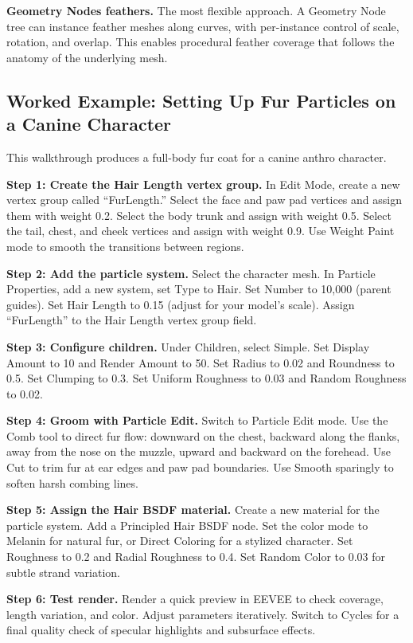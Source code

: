 \textbf{Geometry Nodes feathers.} The most flexible approach. A Geometry Node tree can instance feather meshes along curves, with per-instance control of scale, rotation, and overlap. This enables procedural feather coverage that follows the anatomy of the underlying mesh.



\subsection{Worked Example: Setting Up Fur Particles on a Canine Character}
\label{subsec:worked-fur-particles}

\begin{furrybox}[title={\sffamily\bfseries\small\textcolor{white}{Worked Example --- Complete Fur Particle Setup}}]
This walkthrough produces a full-body fur coat for a canine anthro character.

\textbf{Step 1: Create the Hair Length vertex group.}
In Edit Mode, create a new vertex group called ``FurLength.'' Select the face and paw pad vertices and assign them with weight 0.2. Select the body trunk and assign with weight 0.5. Select the tail, chest, and cheek vertices and assign with weight 0.9. Use Weight Paint mode to smooth the transitions between regions.

\textbf{Step 2: Add the particle system.}
Select the character mesh. In Particle Properties, add a new system, set Type to Hair. Set Number to 10,000 (parent guides). Set Hair Length to 0.15 (adjust for your model's scale). Assign ``FurLength'' to the Hair Length vertex group field.

\textbf{Step 3: Configure children.}
Under Children, select Simple. Set Display Amount to 10 and Render Amount to 50. Set Radius to 0.02 and Roundness to 0.5. Set Clumping to 0.3. Set Uniform Roughness to 0.03 and Random Roughness to 0.02.

\textbf{Step 4: Groom with Particle Edit.}
Switch to Particle Edit mode. Use the Comb tool to direct fur flow: downward on the chest, backward along the flanks, away from the nose on the muzzle, upward and backward on the forehead. Use Cut to trim fur at ear edges and paw pad boundaries. Use Smooth sparingly to soften harsh combing lines.

\textbf{Step 5: Assign the Hair BSDF material.}
Create a new material for the particle system. Add a Principled Hair BSDF node. Set the color mode to Melanin for natural fur, or Direct Coloring for a stylized character. Set Roughness to 0.2 and Radial Roughness to 0.4. Set Random Color to 0.03 for subtle strand variation.

\textbf{Step 6: Test render.}
Render a quick preview in EEVEE to check coverage, length variation, and color. Adjust parameters iteratively. Switch to Cycles for a final quality check of specular highlights and subsurface effects.
\end{furrybox}


